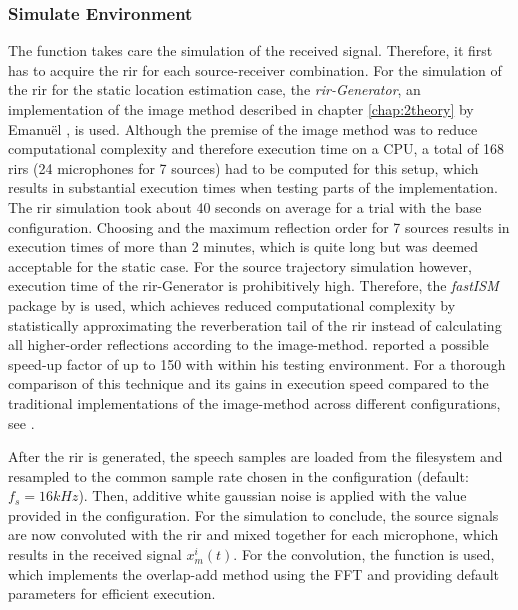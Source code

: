\subsubsection{Simulate Environment}
The  function takes care the simulation of the received signal. Therefore, it first has to acquire the \gls{rir} for each source-receiver combination. For the simulation of the \gls{rir} for the static location estimation case, the \emph{\gls{rir}-Generator}, an implementation of the image method described in chapter \ref{chap:2theory} by Emanuël \citet*{Habets2014}, is used. Although the premise of the image method was to reduce computational complexity and therefore execution time on a CPU, a total of 168 \glspl{rir} (24 microphones for 7 sources) had to be computed for this setup, which results in substantial execution times when testing parts of the implementation. The \gls{rir} simulation took about 40 seconds on average for a trial with the base configuration. Choosing  and the maximum reflection order for 7 sources results in execution times of more than 2 minutes, which is quite long but was deemed acceptable for the static case. For the source trajectory simulation however, execution time of the \gls{rir}-Generator is prohibitively high. Therefore, the \emph{fastISM} package by \citeauthor{Lehmann2010} is used, which achieves reduced computational complexity by statistically approximating the reverberation tail of the \gls{rir} instead of calculating all higher-order reflections according to the image-method. \citeauthor{Lehmann2010} reported a possible speed-up factor of up to 150 with  within his testing environment. For a thorough comparison of this technique and its gains in execution speed compared to the traditional implementations of the image-method across different configurations, see \cite{Lehmann2010}.

After the \gls{rir} is generated, the speech samples are loaded from the filesystem and resampled to the common sample rate chosen in the configuration (default: $f_s=16kHz$). Then, additive white gaussian noise is applied with the  value provided in the configuration. For the simulation to conclude, the source signals are now convoluted with the \gls{rir} and mixed together for each microphone, which results in the received signal $x_m^i(t)$. For the convolution, the \matlab function  is used, which implements the overlap-add method using the FFT and providing default parameters for efficient execution.

